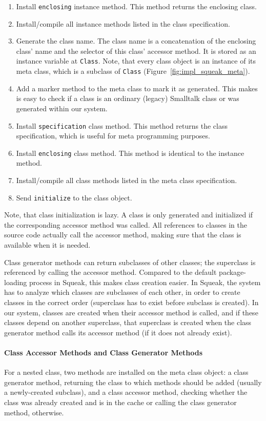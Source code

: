 \begin{enumerate}
	\item Install \texttt{enclosing} instance method. This method returns the enclosing class.
	\item Install/compile all instance methods listed in the class specification.
	\item Generate the class name. The class name is a concatenation of the enclosing class' name and the selector of this class' accessor method. It is stored as an instance variable at \texttt{Class}. Note, that every class object is an instance of its meta class, which is a subclass of \texttt{Class} (Figure~\ref{fig:impl_squeak_meta}).
	\item Add a marker method to the meta class to mark it as generated. This makes is easy to check if a class is an ordinary (legacy) Smalltalk class or was generated within our system.
	\item Install \texttt{specification} class method. This method returns the class specification, which is useful for meta programming purposes.
	\item Install \texttt{enclosing} class method. This method is identical to the instance method.
	\item Install/compile all class methods listed in the meta class specification.
	\item Send \texttt{initialize} to the class object.
\end{enumerate}

Note, that class initialization is lazy. A class is only generated and initialized if the corresponding accessor method was called. All references to classes in the source code actually call the accessor method, making sure that the class is available when it is needed. 

Class generator methods can return subclasses of other classes; the superclass is referenced by calling the accessor method. Compared to the default package-loading process in Squeak, this makes class creation easier. In Squeak, the system has to analyze which classes are subclasses of each other, in order to create classes in the correct order (superclass has to exist before subclass is created). In our system, classes are created when their accessor method is called, and if these classes depend on another superclass, that superclass is created when the class generator method calls its accessor method (if it does not already exist).

\paragraph{Class Accessor Methods and Class Generator Methods}
For a nested class, two methods are installed on the meta class object: a class generator method, returning the class to which methods should be added (usually a newly-created subclass), and a class accessor method, checking whether the class was already created and is in the cache or calling the class generator method, otherwise.

